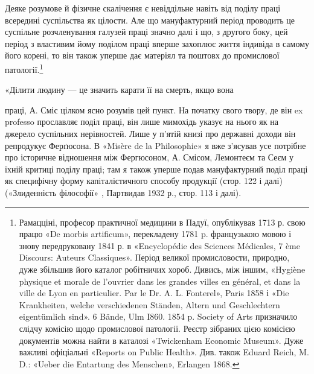 Деяке розумове й фізичне скалічення є невіддільне навіть від
поділу праці всередині суспільства як цілости. Але що мануфактурний
період проводить це суспільне розчленування галузей
праці значно далі і що, з другого боку, цей період з властивим
йому поділом праці вперше захоплює життя індивіда в самому
його корені, то він також уперше дає матеріял та поштовх до
промислової патології.\footnote{
Рамацціні, професор практичної медицини в Падуї, опублікував
1713 р. свою працю «De morbis artificum», перекладену 1781 p.
французькою мовою і знову передруковану 1841 р. в «Encyclopédie des
Sciences Médicales, 7 ème Discours: Auteurs Classiques». Період великої
промисловости, природно, дуже збільшив його каталог робітничих хороб.
Дивись, між іншим, «Hygiène physique et morale de l’ouvrier dans les
grandes villes en général, et dans la ville de Lyon en particulier. Par le
Dr. A. L. Fonterel», Paris 1858 і «Die Krankheiten, welche verschiedenen
Ständen, Altern und Geschlechtern eigentümlich sind». 6 Bände, Ulm I860.
1854 p. Society of Arts призначило слідчу комісію щодо промислової
патології. Реєстр зібраних цією комісією документів можна найти в каталозі
«Twickenham Economic Museum». Дуже важливі офіціальні «Reports
on Public Health». Див. також Eduard Reich, M. D.: «Ueber
die Entartung des Menschen», Erlangen 1868.
}

«Ділити людину — це значить карати її на смерть, якщо вона

праці, А. Сміс цілком ясно розумів цей пункт. На початку свого твору,
де він ex professo прославляє поділ праці, він лише мимохідь указує на
нього як на джерело суспільних нерівностей. Лише у п’ятій книзі про
державні доходи він репродукує Ферґюсона. В «Misère de la Philosophie»
я вже з’ясував усе потрібне про історичне відношення між Фергюсоном,
А. Смісом, Лемонтеєм та Сеєм у їхній критиці поділу праці; там
я також уперше подав мануфактурний поділ праці як специфічну форму
капіталістичного способу продукції (стор. 122 і далі) («Злиденність філософії»
, Партвидав 1932 р., стор. 113 і далі).
\parbreak{}  %
